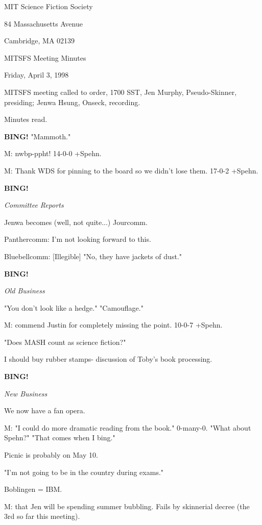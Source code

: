 \documentclass[12pt]{article}
\newcommand{\bing}{{\bf BING!} }
\newcommand{\goto}[1]{\bing \vskip 12pt \centerline{{\em{#1}}}}
\begin{document}
\begin{center}

MIT Science Fiction Society 

84 Massachusetts Avenue

Cambridge, MA 02139

\vspace{12pt}

MITSFS Meeting Minutes 

Friday, April 3, 1998

\end{center}
 
\vspace{18pt}

\setlength{\parskip}{6pt}

\noindent
MITSFS meeting called to order, 1700 SST,
Jen Murphy, Pseudo-Skinner, presiding; Jenwa Hsung, Onseck, recording.

Minutes read.

\bing "Mammoth."

M: nwbp-ppht! 14-0-0 +Spehn.

M: Thank WDS for pinning to the board so we didn't lose them. 17-0-2 +Spehn.

\goto{Committee Reports}

Jenwa becomes (well, not quite...) Jourcomm.

Panthercomm: I'm not looking forward to this.

Bluebellcomm: [Illegible] "No, they have jackets of dust."

\goto{Old Business}

"You don't look like a hedge." "Camouflage."

M: commend Justin for completely missing the point. 10-0-7 +Spehn.

"Does MASH count as science fiction?"

I should buy rubber stamps- discussion of Toby's book processing.

\goto{New Business}

We now have a fan opera.

M: "I could do more dramatic reading from the book." 0-many-0. "What about Spehn?" "That comes when I bing."

Picnic is probably on May 10.

"I'm not going to be in the country during exams."

Boblingen = IBM.

M: that Jen will be spending summer bubbling. Fails by skinnerial decree (the 3rd so far this meeting).
\end{document}
